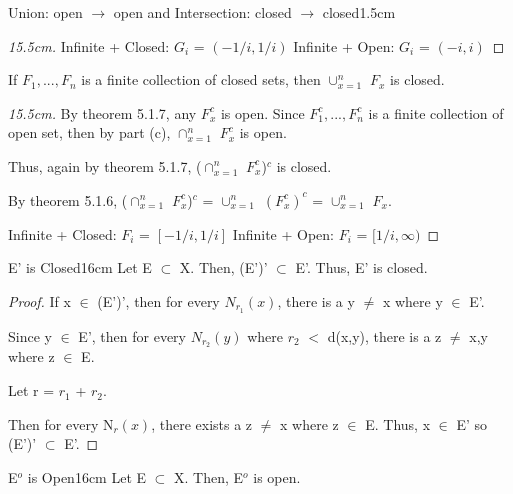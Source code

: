 \begin{ltheorem}{Union: open $\rightarrow$ open and
	Intersection: closed $\rightarrow$ closed}{1.5cm}
\begin{proof}[15.5cm]
				\vspace{0.1cm}

				{\color{purple} Infinite + Closed}: $G_i$ = $(-1/i,1/i)$
				\hfill
				{\color{purple} Infinite + Open}: $G_i$ = $(-i,i)$
			\end{proof}

		\item If $F_1, ... , F_n$ is a finite collection of closed sets,
		then $\cup_{x=1}^n$ $F_x$ is closed.

			\begin{proof}[15.5cm]
				By {\color{red} theorem 5.1.7}, any $F_x^c$ is open.
				Since $F_1^c, ... , F_n^c$ is a finite collection of
				open set, then by part (c), $\cap_{x=1}^n$ $F_x^c$ is open.

				Thus, again by {\color{red} theorem 5.1.7},
				($\cap_{x=1}^n$ $F_x^c$)$^c$ is closed.

				By {\color{red} theorem 5.1.6},
				($\cap_{x=1}^n$ $F_x^c$)$^c$ = $\cup_{x=1}^n$ $(F_x^c)^c$
				= $\cup_{x=1}^n$ $F_x$.

				\vspace{0.1cm}

				{\color{purple} Infinite + Closed}: $F_i$ = $[-1/i,1/i]$
				\hfill
				{\color{purple} Infinite + Open}: $F_i$ = $[1/i,\infty)$
			\end{proof}	 
	\end{ltheorem}

	\newpage



	\begin{wtheorem}{E' is Closed}{16cm}
		Let  E $\subset$ X. Then, (E')' $\subset$ E'.
		Thus, E' is closed.
	\end{wtheorem}
	
	\begin{proof}
		If x $\in$ (E')', then for every $N_{r_1}(x)$, there is a
		y $\not =$ x where y $\in$ E'.
		
		Since y $\in$ E', then for every $N_{r_2}(y)$
		where $r_2$ $<$ d(x,y), there is a
		z $\not =$ x,y where z $\in$ E.

		Let r = $r_1$ + $r_2$.

		Then for every N$_r(x)$, there exists a z $\not =$ x where
		z $\in$ E.
		Thus, x $\in$ E' so (E')' $\subset$ E'.
	\end{proof}

	\vspace{0.5cm}



	\begin{wtheorem}{E$^o$ is Open}{16cm}
		Let  E $\subset$ X. Then, E$^o$ is open. 
	\end{wtheorem}
	
